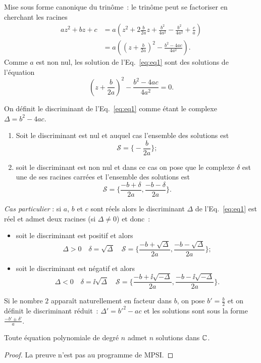 Mise sous forme canonique du trinôme~: le trinôme peut se factoriser en cherchant les racines
\begin{align}
  az^2+bz+c &= a \left(z^2+ 2 \frac{b}{2a}z + \frac{b^2}{4a^2} - \frac{b^2}{4a^2} +\frac{c}{a} \right)\\
  &=a \left( \left(z+\frac{b}{2a} \right)^2 - \frac{b^2-4ac}{4a^2} \right).
\end{align}
Comme $a$ est non nul, les solution de l'Eq.~\eqref{eq:eq1} sont des solutions de l'équation
\begin{equation}
  \left(z+\frac{b}{2a} \right)^2 - \frac{b^2-4ac}{4a^2} =0.
\end{equation}
%
\begin{defdef}
  On définit le discriminant de l'Eq.~\eqref{eq:eq1} comme étant le complexe $\Delta=b^2-4ac$.
\end{defdef}
%
\begin{enumerate}
\item Soit le discriminant est nul et auquel cas l'ensemble des solutions est
  \begin{equation}
    \mathcal{S}=\biggl\lbrace-\frac{b}{2a} \biggl\rbrace;
  \end{equation}
\item soit le discriminant est non nul et dans ce cas on pose que le complexe $\delta$ est une de ses racines carrées et l'ensemble des solutions est
\begin{equation}
  \mathcal{S}=\biggl\lbrace \frac{-b+\delta}{2a} , \frac{-b-\delta}{2a} \biggl\rbrace.
\end{equation}
\end{enumerate}

\emph{Cas particulier} : si $a$, $b$ et $c$ sont réels alors le discriminant $\Delta$ de l'Eq.~\eqref{eq:eq1} est réel et admet deux racines (si $\Delta \neq 0$) et donc~:
\begin{itemize}
\item soit le discriminant est positif et alors
  \begin{equation}
    \Delta >0 \quad \delta=\sqrt{\Delta} \quad \mathcal{S} = \biggl\lbrace \frac{-b+\sqrt{\Delta}}{2a} , \frac{-b-\sqrt{\Delta}}{2a} \biggl\rbrace;
  \end{equation}
\item soit le discriminant est négatif et alors
  \begin{equation}
    \Delta <0 \quad \delta=\ii\sqrt{\Delta} \quad \mathcal{S} = \biggl\lbrace \frac{-b+\ii\sqrt{-\Delta}}{2a} , \frac{-b-\ii\sqrt{-\Delta}}{2a} \biggl\rbrace.
  \end{equation}
\end{itemize}
Si le nombre $2$ apparaît naturellement en facteur dans $b$, on pose $b'=\frac{b}{2}$ et on définit le discriminant réduit~: $\Delta'=b'^2-ac$ et les solutions sont sous la forme $\frac{-b'\pm \delta'}{a}$.
%
\begin{theo}
  Toute équation polynomiale de degré $n$ admet $n$ solutions dans $\mathbb{C}$.
\end{theo}
\begin{proof}
  La preuve n'est pas au programme de MPSI.
\end{proof}
%
